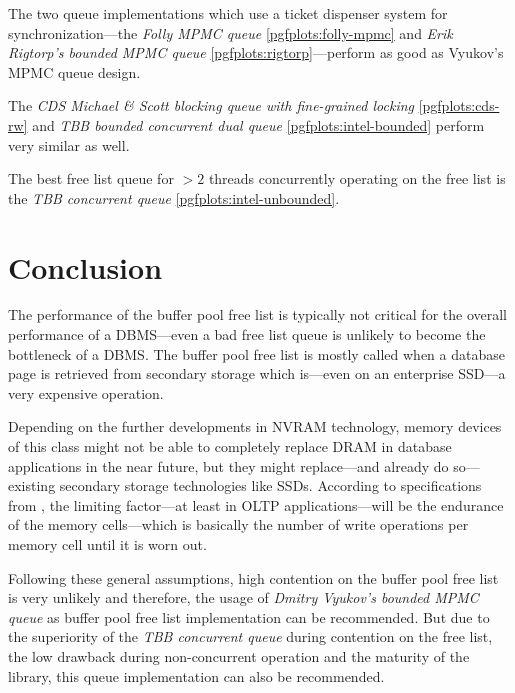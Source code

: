 \begin{@empty}
    The two queue implementations which use a ticket dispenser system for synchronization---the \emph{Folly MPMC queue} \ref{pgfplots:folly-mpmc} and \emph{Erik Rigtorp's bounded MPMC queue} \ref{pgfplots:rigtorp}---perform as good as Vyukov's MPMC queue design.

    The \emph{CDS Michael \& Scott blocking queue with fine-grained locking} \ref{pgfplots:cds-rw} and \emph{TBB bounded concurrent dual queue} \ref{pgfplots:intel-bounded} perform very similar as well.

    The best free list queue for $>2$ threads concurrently operating on the free list is the \emph{TBB concurrent queue} \ref{pgfplots:intel-unbounded}.
\end{@empty}

\section{Conclusion}

    The performance of the buffer pool free list is typically not critical for the overall performance of a DBMS---even a bad free list queue is unlikely to become the bottleneck of a DBMS. The buffer pool free list is mostly called when a database page is retrieved from secondary storage which is---even on an enterprise SSD---a very expensive operation.

    Depending on the further developments in NVRAM technology, memory devices of this class might not be able to completely replace DRAM in database applications in the near future, but they might replace---and already do so---existing secondary storage technologies like SSDs. According to specifications from \cite{Arulraj:2015}, the limiting factor---at least in OLTP applications---will be the endurance of the memory cells---which is basically the number of write operations per memory cell until it is worn out.

    Following these general assumptions, high contention on the buffer pool free list is very unlikely and therefore, the usage of \emph{Dmitry Vyukov's bounded MPMC queue} as buffer pool free list implementation can be recommended. But due to the superiority of the \emph{TBB concurrent queue} during contention on the free list, the low drawback during non-concurrent operation and the maturity of the library, this queue implementation can also be recommended.
